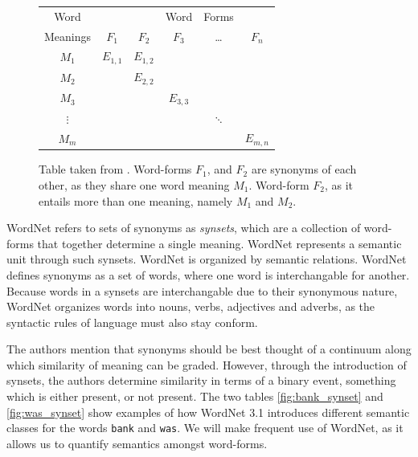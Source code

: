 \documentclass[a4paper,12pt,oneside,openright]{report}
\begin{document}
\begin{figure}
\begin{center}
\begin{tabular}{ | c | c  c  c  c  c | } 
 \hline
 Word        &  &  & Word & Forms &  \\ 
 Meanings & $F_1$ & $F_2$ & $F_3$ & \ldots & $F_n$ \\ 
 \hline
 $M_1$     & $E_{1,1}$ & $E_{1,2}$ &  &  &  \\ 
 $M_2$     &  & $E_{2,2}$ &  &  &  \\ 
 $M_3$     &  &  & $E_{3, 3}$ &  &  \\ 
 $\vdots$ &  &  &  & $\ddots$ &  \\ 
 $M_m$    &  &  &  &  & $E_{m, n}$ \\ 
 \hline
\end{tabular}
\end{center}
\caption{Table taken from \cite{miller90}. Word-forms $F_1$, and $F_2$ are synonyms of each other, as they share one word meaning $M_1$. Word-form $F_2$, as it entails more than one meaning, namely $M_1$ and $M_2$.}
\label{fig:wordnet_table}
\end{figure}

WordNet refers to sets of synonyms as \textit{synsets}, which are a collection of word-forms that together determine a single meaning.
WordNet represents a semantic unit through such synsets.
WordNet is organized by semantic relations.
WordNet defines synonyms as a set of words, where one word is interchangable for another.
Because words in a synsets are interchangable due to their synonymous nature, WordNet organizes words into nouns, verbs, adjectives and adverbs, as the syntactic rules of language must also stay conform.

The authors mention that synonyms should be best thought of a continuum along which similarity of meaning can be graded.
However, through the introduction of synsets, the authors determine similarity in terms of a binary event, something which is either present, or not present.
The two tables \ref{fig:bank_synset} and \ref{fig:was_synset} show examples of how WordNet 3.1 introduces different semantic classes for the words \Verb#bank# and \texttt{was}.
We will make frequent use of WordNet, as it allows us to quantify semantics amongst word-forms.
\end{document}
